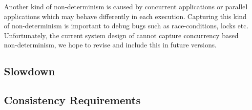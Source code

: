 Another kind of non-determinism is caused by concurrent applications or parallel applications which may behave differently in each execution.
Capturing this kind of non-determinism is important to debug bugs such as race-conditions, locks etc.
Unfortunately, the current system design of \parikshan cannot capture concurrency based non-determinism, we hope to revise and include this in future versions.

\subsection{Slowdown}
\label{sec:slowdown}


\subsection{Consistency Requirements}
\label{sec:consistency}
